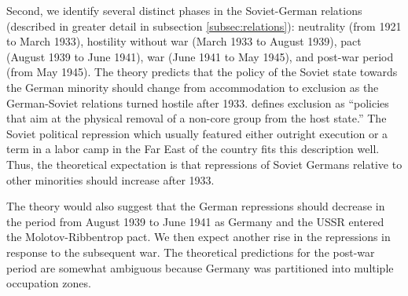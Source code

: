 Second, we identify several distinct phases in the Soviet-German  relations (described in greater detail in subsection \ref{subsec:relations}): neutrality (from 1921 to March 1933), hostility without war (March 1933 to August 1939), pact (August 1939 to June 1941), war (June 1941 to May 1945), and post-war period (from May 1945). 
The theory predicts that the policy of the Soviet state towards the German minority should change from accommodation to exclusion as the German-Soviet relations turned hostile after 1933. \citet[p. 22]{mylonas_politics_2013} defines exclusion as \enquote{policies that aim at the physical removal of a non-core group from the host state.} The Soviet political repression which usually featured either outright execution or a term in a labor camp in the Far East of the country fits this description well. Thus, the theoretical expectation is that  repressions of Soviet Germans relative to other minorities should increase after 1933.  

The theory would also suggest that the German repressions should decrease in the period from August 1939 to June 1941 as Germany and the USSR entered the Molotov-Ribbentrop pact. 
We then expect another rise in the repressions in response to the subsequent war.
The theoretical predictions for the post-war period are somewhat ambiguous because  Germany was partitioned into multiple occupation zones.  








